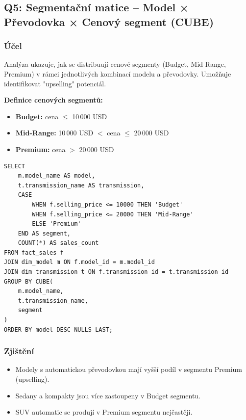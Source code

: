\documentclass[12pt,a4paper]{article}
\begin{document}
\subsection{Q5: Segmentační matice – Model × Převodovka × Cenový segment (CUBE)}

\subsubsection{Účel}

Analýza ukazuje, jak se distribuují cenové segmenty (Budget, Mid-Range, Premium) v rámci
jednotlivých kombinací modelu a převodovky. Umožňuje identifikovat "upselling" potenciál.

\textbf{Definice cenových segmentů:}
\begin{itemize}
    \item \textbf{Budget:} cena $\leq$ 10\,000 USD
    \item \textbf{Mid-Range:} 10\,000 USD $<$ cena $\leq$ 20\,000 USD
    \item \textbf{Premium:} cena $>$ 20\,000 USD
\end{itemize}

\begin{lstlisting}[caption=Q5: Segmentační analýza – CUBE]
SELECT 
    m.model_name AS model,
    t.transmission_name AS transmission,
    CASE 
        WHEN f.selling_price <= 10000 THEN 'Budget'
        WHEN f.selling_price <= 20000 THEN 'Mid-Range'
        ELSE 'Premium'
    END AS segment,
    COUNT(*) AS sales_count
FROM fact_sales f
JOIN dim_model m ON f.model_id = m.model_id
JOIN dim_transmission t ON f.transmission_id = t.transmission_id
GROUP BY CUBE(
    m.model_name,
    t.transmission_name,
    segment
)
ORDER BY model DESC NULLS LAST;
\end{lstlisting}

\subsubsection{Zjištění}

\begin{itemize}
    \item Modely s automatickou převodovkou mají vyšší podíl v segmentu Premium (upselling).
    \item Sedany a kompakty jsou více zastoupeny v Budget segmentu.
    \item SUV automatic se prodují v Premium segmentu nejčastěji.
\end{itemize}
\end{document}

